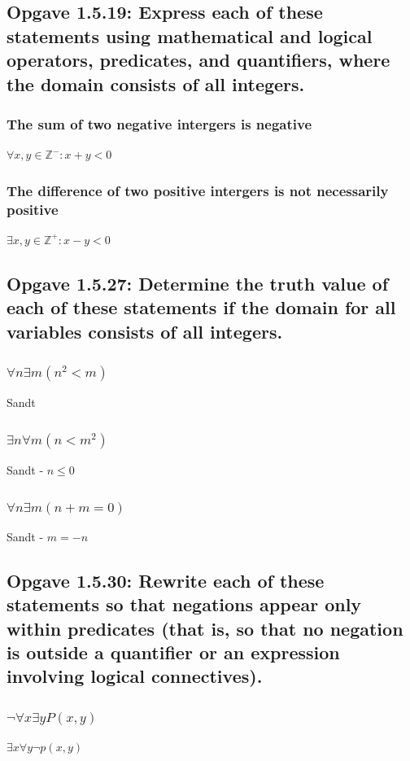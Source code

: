 \documentclass[12pt, a4paper]{report}
\begin{document}
			\subsection{Opgave 1.5.19: Express each of these statements using mathematical and logical operators, predicates, and quantiﬁers, where the domain consists of all integers.}
				\subsubsection{The sum of two negative intergers is negative}
					$\forall x,y \in \mathbb{Z}^-: x+y <0$	
				\subsubsection{The difference of two positive intergers is not necessarily positive}
					$\exists x,y \in \mathbb{Z}^+: x-y < 0$
			\setcounter{subsection}{26}
			\subsection{Opgave 1.5.27: Determine the truth value of each of these statements if the domain for all variables consists of all integers.}
				\subsubsection{$\forall n \exists m(n^2 <m)$}
					Sandt	
				\subsubsection{$\exists n \forall m(n<m^2)$}
					Sandt - $n\leq 0$
				\subsubsection{$\forall n \exists m(n+m=0)$}
					Sandt - $m=-n$
			\setcounter{subsection}{29}
			\subsection{ Opgave 1.5.30: Rewrite each of these statements so that negations appear only within predicates (that is, so that no negation is outside a quantiﬁer or an expression involving logical connectives).}
				\subsubsection{$\neg\forall x\exists y  P(x,y)$}	
					$\exists x \forall y \neg p(x,y)$
			\setcounter{subsection}{38}
\end{document}
